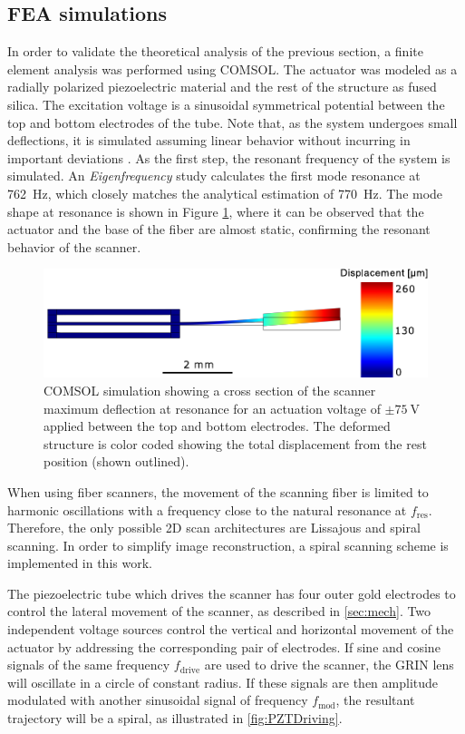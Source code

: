 \documentclass[10pt]{iopart}
\begin{document}
\subsection{FEA simulations}
In order to validate the theoretical analysis of the previous section, a finite element analysis was performed using COMSOL. The actuator was modeled as a radially polarized piezoelectric material and the rest of the structure as fused silica. The excitation voltage is a sinusoidal symmetrical potential between the top and bottom electrodes of the tube. Note that, as the system undergoes small deflections, it is simulated assuming linear behavior without incurring in important deviations \cite{Fertis2006}. As the first step, the resonant frequency of the system is simulated. An \textit{Eigenfrequency} study calculates the first mode resonance at \SI{762}{\hertz}, which closely matches the analytical estimation of \SI{770}{\hertz}. The mode shape at resonance is shown in Figure \ref{fig:defle}, where it can be observed that the actuator and the base of the fiber are almost static, confirming the resonant behavior of the scanner.

\begin{figure}[h!]\centering
      \includegraphics[width=\columnwidth]{figures/deflection.pdf}
      \caption{COMSOL simulation showing a cross section of the scanner maximum deflection at resonance for an actuation voltage of $\pm \SI{75}{\volt}$ applied between the top and bottom electrodes. The deformed structure is color coded showing the total displacement from the rest position (shown outlined). }
      \label{fig:defle}
\end{figure}

When using fiber scanners, the movement of the scanning fiber is limited to harmonic oscillations with a frequency close to the natural resonance at $f_\mathrm{res}$. Therefore, the only possible 2D scan architectures are Lissajous \cite{Moon2010} and spiral scanning. In order to simplify image reconstruction, a spiral scanning scheme is implemented in this work.

The piezoelectric tube which drives the scanner has four outer gold electrodes to control the lateral movement of the scanner, as described in \autoref{sec:mech}. Two independent voltage sources control the vertical and horizontal movement of the actuator by addressing the corresponding pair of electrodes. If sine and cosine signals of the same frequency $f_\mathrm{drive}$ are used to drive the scanner, the GRIN lens will oscillate in a circle of constant radius. If these signals are then amplitude modulated with another sinusoidal signal of frequency $f_\mathrm{mod}$, the resultant trajectory will be a spiral, as illustrated in \autoref{fig:PZTDriving}.
\end{document}
